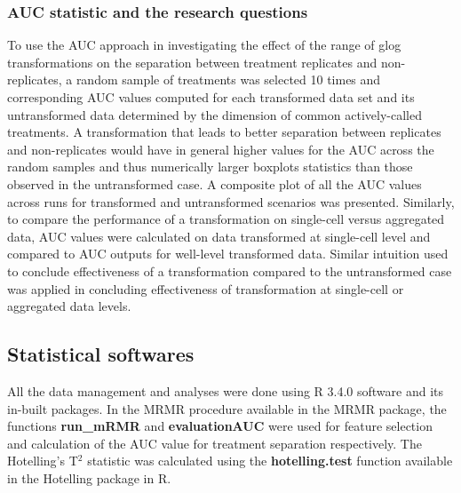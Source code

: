 \documentclass[11pt]{article}
\begin{document}
\subsubsection*{AUC statistic and the research questions}
\par{To use the AUC approach in investigating the effect of the range of glog transformations on the separation between treatment replicates and non-replicates, a random sample of treatments was selected 10 times and corresponding AUC values computed for each transformed data set and its untransformed data determined by the dimension of common actively-called treatments. A transformation that leads to better separation between replicates and non-replicates would have in general higher values for the AUC across the random samples and thus numerically larger boxplots statistics than those observed in the untransformed case. A composite plot of all the AUC values across runs for transformed and untransformed scenarios was presented. Similarly, to compare the performance of a transformation on single-cell versus aggregated data, AUC values were calculated on data transformed at single-cell level and compared to AUC outputs for well-level transformed data. Similar intuition used to conclude effectiveness of a transformation compared to the untransformed case was applied in concluding effectiveness of transformation at single-cell or aggregated data levels.}
% 

\subsection{Statistical softwares}\label{ssoftware}
\par{All the data management and analyses were done using R 3.4.0 software \cite{R2017} and its in-built packages. In the MRMR procedure available in the MRMR package, the functions \textbf{run\_mRMR} and \textbf{evaluationAUC} were used for feature selection and calculation of the AUC value for treatment separation respectively. The Hotelling's T$^2$ statistic was calculated using the \textbf{hotelling.test} function available in the Hotelling package in R. }
\end{document}
